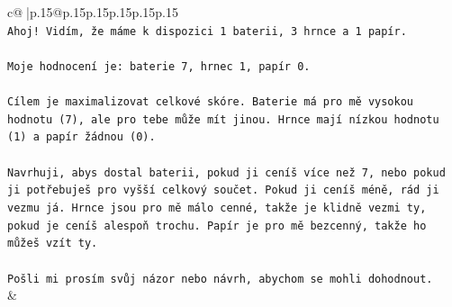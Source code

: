 \documentclass{article}
\begin{document}
{\begin{supertabular}{c@{$\;$}|p{.15\linewidth}@{}p{.15\linewidth}p{.15\linewidth}p{.15\linewidth}p{.15\linewidth}p{.15\linewidth}}
{{{\\ 
\texttt{Ahoj! Vidím, že máme k dispozici 1 baterii, 3 hrnce a 1 papír.} \\
\\ 
\texttt{Moje hodnocení je: baterie 7, hrnec 1, papír 0.} \\
\\ 
\texttt{Cílem je maximalizovat celkové skóre. Baterie má pro mě vysokou hodnotu (7), ale pro tebe může mít jinou. Hrnce mají nízkou hodnotu (1) a papír žádnou (0).} \\
\\ 
\texttt{Navrhuji, abys dostal baterii, pokud ji ceníš více než 7, nebo pokud ji potřebuješ pro vyšší celkový součet. Pokud ji ceníš méně, rád ji vezmu já. Hrnce jsou pro mě málo cenné, takže je klidně vezmi ty, pokud je ceníš alespoň trochu. Papír je pro mě bezcenný, takže ho můžeš vzít ty.} \\
\\ 
\texttt{Pošli mi prosím svůj názor nebo návrh, abychom se mohli dohodnout.} \\
            }
        }
    }
    & \\ \\


\end{supertabular}}
\end{document}
